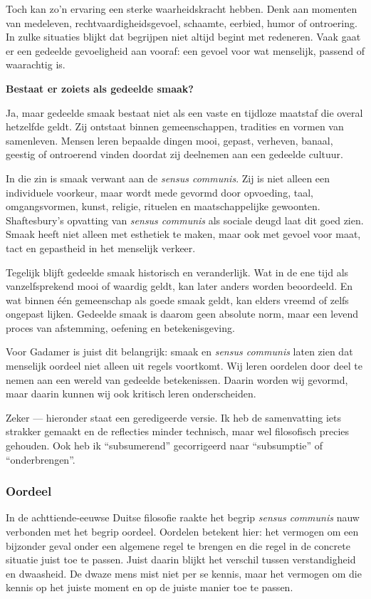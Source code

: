 \documentclass[11pt,twoside,openright]{memoir}
\begin{document}
Toch kan zo'n ervaring een sterke waarheidskracht hebben. Denk aan momenten van medeleven, rechtvaardigheidsgevoel, schaamte, eerbied, humor of ontroering. In zulke situaties blijkt dat begrijpen niet altijd begint met redeneren. Vaak gaat er een gedeelde gevoeligheid aan vooraf: een gevoel voor wat menselijk, passend of waarachtig is.

\bigskip
\noindent
\textbf{Bestaat er zoiets als gedeelde smaak?}
\medskip

Ja, maar gedeelde smaak bestaat niet als een vaste en tijdloze maatstaf die overal hetzelfde geldt. Zij ontstaat binnen gemeenschappen, tradities en vormen van samenleven. Mensen leren bepaalde dingen mooi, gepast, verheven, banaal, geestig of ontroerend vinden doordat zij deelnemen aan een gedeelde cultuur.

In die zin is smaak verwant aan de \textit{sensus communis}. Zij is niet alleen een individuele voorkeur, maar wordt mede gevormd door opvoeding, taal, omgangsvormen, kunst, religie, rituelen en maatschappelijke gewoonten. Shaftesbury's opvatting van \textit{sensus communis} als sociale deugd laat dit goed zien. Smaak heeft niet alleen met esthetiek te maken, maar ook met gevoel voor maat, tact en gepastheid in het menselijk verkeer.

Tegelijk blijft gedeelde smaak historisch en veranderlijk. Wat in de ene tijd als vanzelfsprekend mooi of waardig geldt, kan later anders worden beoordeeld. En wat binnen één gemeenschap als goede smaak geldt, kan elders vreemd of zelfs ongepast lijken. Gedeelde smaak is daarom geen absolute norm, maar een levend proces van afstemming, oefening en betekenisgeving.

Voor Gadamer is juist dit belangrijk: smaak en \textit{sensus communis} laten zien dat menselijk oordeel niet alleen uit regels voortkomt. Wij leren oordelen door deel te nemen aan een wereld van gedeelde betekenissen. Daarin worden wij gevormd, maar daarin kunnen wij ook kritisch leren onderscheiden.

Zeker — hieronder staat een geredigeerde versie. Ik heb de samenvatting iets strakker gemaakt en de reflecties minder technisch, maar wel filosofisch precies gehouden. Ook heb ik “subsumerend” gecorrigeerd naar “subsumptie” of “onderbrengen”.

\subsubsection{Oordeel}

In de achttiende-eeuwse Duitse filosofie raakte het begrip \textit{sensus communis} nauw verbonden met het begrip oordeel. Oordelen betekent hier: het vermogen om een bijzonder geval onder een algemene regel te brengen en die regel in de concrete situatie juist toe te passen. Juist daarin blijkt het verschil tussen verstandigheid en dwaasheid. De dwaze mens mist niet per se kennis, maar het vermogen om die kennis op het juiste moment en op de juiste manier toe te passen.
\end{document}
